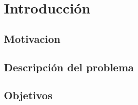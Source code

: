     \chapter{Introducción}
    \section{Motivacion}
    \section{Descripción del problema}
    \section{Objetivos}

